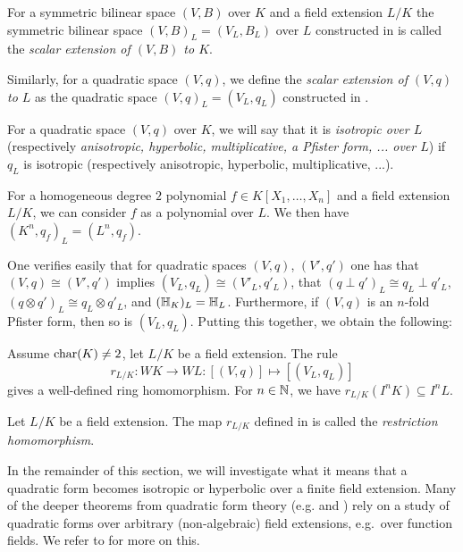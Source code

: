 \documentclass[12pt, leqno, british]{amsart}
\begin{document}
\begin{defi}\label{D:scalar-extension}
For a symmetric bilinear space $(V, B)$ over $K$ and a field extension $L/K$ the symmetric bilinear space $(V, B)_L = (V_L, B_L)$ over $L$ constructed in  is called the \emph{scalar extension of $(V, B)$ to $K$}.

Similarly, for a quadratic space $(V, q)$, we define the \emph{scalar extension of $(V, q)$ to $L$} as the quadratic space $(V, q)_L = (V_L, q_L)$ constructed in .

For a quadratic space $(V, q)$ over $K$, we will say that it is \emph{isotropic over $L$} (respectively \emph{anisotropic, hyperbolic, multiplicative, a Pfister form, ... over $L$}) if $q_L$ is isotropic (respectively anisotropic, hyperbolic, multiplicative, ...).
\end{defi}
\begin{rem}
For a homogeneous degree $2$ polynomial $f \in K[X_1, \ldots, X_n]$ and a field extension $L/K$, we can consider $f$ as a polynomial over $L$.
We then have $(K^n, q_f)_L = (L^n, q_f)$.
\end{rem}
One verifies easily that for quadratic spaces $(V, q)$, $(V', q')$ one has that $(V, q) \cong (V', q')$ implies $(V_L, q_L) \cong (V'_L, q'_L)$, that $(q \perp q')_L \cong q_L \perp q'_L$, $(q \otimes q')_L \cong q_L \otimes q'_L$, and $(\mathbb{H}_K)_L = \mathbb{H}_L$. Furthermore, if $(V, q)$ is an $n$-fold Pfister form, then so is $(V_L, q_L)$.
Putting this together, we obtain the following:
\begin{prop}\label{P:restriction-homomorphism}
Assume $\operatorname{char}(K) \neq 2$, let $L/K$ be a field extension.
The rule
$$ r_{L/K} : WK \to WL : [(V, q)] \mapsto [(V_L, q_L)] $$
gives a well-defined ring homomorphism.
For $n \in \mathbb N$, we have $r_{L/K}(I^n K) \subseteq I^nL$.
\end{prop}
\begin{defi}\label{D:restriction-homomorphism}
Let $L/K$ be a field extension.
The map $r_{L/K}$ defined in  is called the \emph{restriction homomorphism}.
\end{defi}
In the remainder of this section, we will investigate what it means that a quadratic form becomes isotropic or hyperbolic over a finite field extension.
Many of the deeper theorems from quadratic form theory (e.g.  and ) rely on a study of quadratic forms over arbitrary (non-algebraic) field extensions, e.g.~over function fields.
We refer to \autocite[Chapters III-IV]{ElmanKarpenkoMerkurjev} for more on this.
\end{document}
